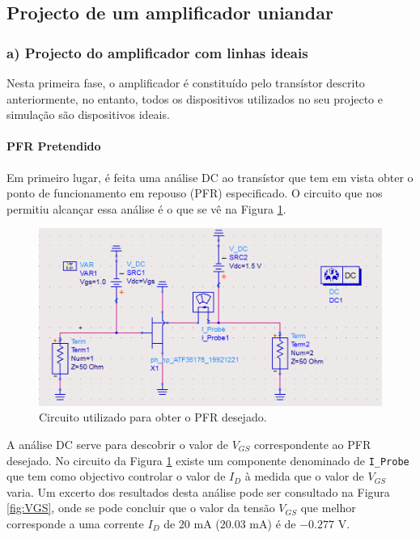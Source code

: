 \documentclass[11pt]{article}
\numberwithin{equation}{section}
\begin{document}
\subsection{Projecto de um amplificador uniandar}

\subsubsection{a) Projecto do amplificador com linhas ideais}

Nesta primeira fase, o amplificador é constituído pelo transístor descrito anteriormente, no entanto, todos os dispositivos utilizados no seu projecto e simulação são dispositivos ideais.

\paragraph{PFR Pretendido} \hspace{0pt} 

Em primeiro lugar, é feita uma análise DC ao transístor que tem em vista obter o ponto de funcionamento em repouso (PFR) especificado. O circuito que nos permitiu alcançar essa análise é o que se vê na Figura \ref{fig:Circuito_0}.

\begin{figure}[H]
	\centering
	\includegraphics[keepaspectratio=true, scale=0.41]{exps/Circuito_0}
	\vspace{-0.5em}
	\caption{Circuito utilizado para obter o PFR desejado.}
	\label{fig:Circuito_0}
	\vspace{-0.8em}
\end{figure} 

A análise DC serve para descobrir o valor de $ V_{GS} $ correspondente ao PFR desejado. No circuito da Figura \ref{fig:Circuito_0} existe um componente denominado de \texttt{I\_Probe} que tem como objectivo controlar o valor de $ I_{D} $ à medida que o valor de $ V_{GS} $ varia. Um excerto dos resultados desta análise pode ser consultado na Figura \ref{fig:VGS}, onde se pode concluir que o valor da tensão  $V_{GS}$ que melhor corresponde a uma corrente $I_{D}$ de $20$ mA ($20.03$ mA) é de $-0.277$ V.
\end{document}
